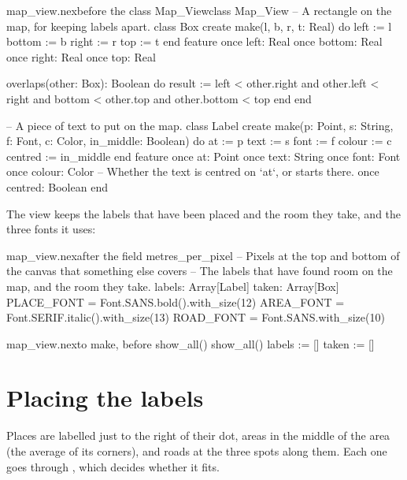 \begin{addbefore}{map_view.nex}{before the class Map_View}{class Map_View}
-- A rectangle on the map, for keeping labels apart.
class Box
create
  make(l, b, r, t: Real) do
    left := l
    bottom := b
    right := r
    top := t
  end
feature
  once left: Real
  once bottom: Real
  once right: Real
  once top: Real

  overlaps(other: Box): Boolean do
    result := left < other.right and other.left < right
      and bottom < other.top and other.bottom < top
  end
end

-- A piece of text to put on the map.
class Label
create
  make(p: Point, s: String, f: Font, c: Color, in_middle: Boolean) do
    at := p
    text := s
    font := f
    colour := c
    centred := in_middle
  end
feature
  once at: Point
  once text: String
  once font: Font
  once colour: Color
  -- Whether the text is centred on `at`, or starts there.
  once centred: Boolean
end
\end{addbefore}

The view keeps the labels that have been placed and the room they take,
and the three fonts it uses:

\begin{addbefore}{map_view.nex}{after the field metres_per_pixel}{  -- Pixels at the top and bottom of the canvas that something else covers}
  -- The labels that have found room on the map, and the room they take.
  labels: Array[Label]
  taken: Array[Box]
  PLACE_FONT = Font.SANS.bold().with_size(12)
  AREA_FONT = Font.SERIF.italic().with_size(13)
  ROAD_FONT = Font.SANS.with_size(10)
\end{addbefore}

\begin{tightaddbefore}{map_view.nex}{to make, before show_all()}{    show_all()}
    labels := []
    taken := []
\end{tightaddbefore}

\section{Placing the labels}

Places are labelled just to the right of their dot, areas in the middle of
the area (the average of its corners), and roads at the three spots along
them. Each one goes through , which decides whether it
fits.

